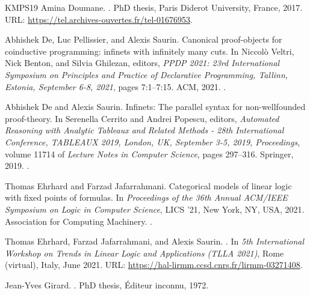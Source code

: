 \documentclass[10pt,a4paper]{amsart}
\theoremstyle{plain}
\theoremstyle{definition}
\theoremstyle{plain}
\theoremstyle{definition} %
\begin{document}
\begin{thebibliography}{KMPS19}
Amina Doumane.
.
\newblock PhD thesis, Paris Diderot University, France, 2017.
\newblock URL: \url{https://tel.archives-ouvertes.fr/tel-01676953}.

Abhishek De, Luc Pellissier, and Alexis Saurin.
\newblock Canonical proof-objects for coinductive programming: infinets with infinitely many cuts.
\newblock In Niccol{\`{o}} Veltri, Nick Benton, and Silvia Ghilezan, editors, {\em {PPDP} 2021: 23rd International Symposium on Principles and Practice of Declarative Programming, Tallinn, Estonia, September 6-8, 2021}, pages 7:1--7:15. {ACM}, 2021.
\newblock \href {https://doi.org/10.1145/3479394.3479402} {}.

Abhishek De and Alexis Saurin.
\newblock Infinets: The parallel syntax for non-wellfounded proof-theory.
\newblock In Serenella Cerrito and Andrei Popescu, editors, {\em Automated Reasoning with Analytic Tableaux and Related Methods - 28th International Conference, {TABLEAUX} 2019, London, UK, September 3-5, 2019, Proceedings}, volume 11714 of {\em Lecture Notes in Computer Science}, pages 297--316. Springer, 2019.
\newblock \href {https://doi.org/10.1007/978-3-030-29026-9\_17} {}.

Thomas Ehrhard and Farzad Jafarrahmani.
\newblock Categorical models of linear logic with fixed points of formulas.
\newblock In {\em Proceedings of the 36th Annual ACM/IEEE Symposium on Logic in Computer Science}, LICS '21, New York, NY, USA, 2021. Association for Computing Machinery.
\newblock \href {https://doi.org/10.1109/LICS52264.2021.9470664} {}.

Thomas Ehrhard, Farzad Jafarrahmani, and Alexis Saurin.
.
\newblock In {\em {5th International Workshop on Trends in Linear Logic and Applications (TLLA 2021)}}, Rome (virtual), Italy, June 2021.
\newblock URL: \url{https://hal-lirmm.ccsd.cnrs.fr/lirmm-03271408}.

Jean-Yves Girard.
.
\newblock PhD thesis, {\'E}diteur inconnu, 1972.


\end{thebibliography}
\end{document}
